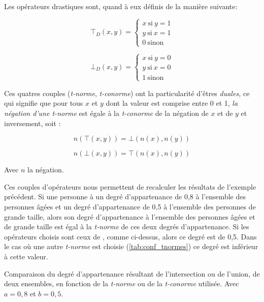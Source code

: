 Les opérateurs drastiques sont, quand à eux définis de la manière
suivante:

\begin{equation}
  ⊤_D(x,y)  = \left \{
    \begin{array}{ll}
      x\ \text{si}\ y=1\\
      y\ \text{si}\ x=1\\
      0\ \text{sinon}
    \end{array}
  \right.
\end{equation}


\begin{equation}
  ⊥_D(x,y)  = \left \{
    \begin{array}{ll}
      x\ \text{si}\ y=0\\
      y\ \text{si}\ x=0\\
      1\ \text{sinon}
    \end{array}
  \right.
\end{equation}



Ces quatres couples (\emph{t-norme}, \emph{t-conorme}) ont la
particularité d'êtres \emph{duales,} ce qui signifie que pour tous
\(x\) et \(y\) dont la valeur est comprise entre 0 et 1, \emph{la négation
d'une \emph{t-norme}} est égale à la \emph{t-conorme} de la négation
de \(x\) et de \(y\) et inversement, soit :

\begin{equation}
  n(⊤(x,y)) = ⊥(n(x), n(y))
\end{equation}

\begin{equation}
  n(⊥(x,y)) = ⊤(n(x), n(y))
\end{equation}

Avec \(n\) la négation.

Ces couples d'opérateurs nous permettent de recalculer les résultats
de l'exemple précédent. Si une personne à un degré d'appartenance de
0,8 à l'ensemble des personnes âgées et un degré d'appartenance de 0,5
à l'ensemble des personnes de grande taille, alors son degré
d'appartenance à l'ensemble des personnes âgées et de grande taille
est égal à la \emph{t-norme} de ces deux degrés d'appartenance. Si les
opérateurs choisis sont ceux de \textcite{Zadeh1965}, comme ci-dessus,
alors ce degré est de 0,5. Dans le cas où une autre \emph{t-norme} est
choisie (\autoref{tab:conf_tnormes}) ce degré est inférieur à cette
valeur.

\begin{table}
  \centering
  
  \caption{Comparaison du degré d'appartenance résultant de
    l'intersection ou de l'union, de deux ensembles, en fonction de la
    \emph{t-norme} ou de la \emph{t-conorme} utilisée. Avec
    \(a = 0,8\) et \(b = 0,5\).}
  \label{tab:conf_tnormes}
\end{table}

